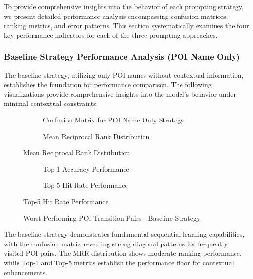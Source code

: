 \documentclass[12pt,a4paper]{article}
\begin{document}
To provide comprehensive insights into the behavior of each prompting strategy, we present detailed performance analysis encompassing confusion matrices, ranking metrics, and error patterns. This section systematically examines the four key performance indicators for each of the three prompting approaches.

\subsubsection{Baseline Strategy Performance Analysis (POI Name Only)}

The baseline strategy, utilizing only POI names without contextual information, establishes the foundation for performance comparison. The following visualizations provide comprehensive insights into the model's behavior under minimal contextual constraints.

\begin{figure}[h]
\centering
\begin{subfigure}{0.48\textwidth}
\centering
\caption{Confusion Matrix for POI Name Only Strategy}
\label{fig:baseline_confusion}
\end{subfigure}
\hfill
\begin{subfigure}{0.48\textwidth}
\centering
\caption{Mean Reciprocal Rank Distribution}
\label{fig:baseline_mrr}
\end{subfigure}
\end{figure}

\begin{figure}[h]
\centering
\begin{subfigure}{0.48\textwidth}
\centering
\caption{Top-1 Accuracy Performance}
\label{fig:baseline_top1}
\end{subfigure}
\hfill
\begin{subfigure}{0.48\textwidth}
\centering
\caption{Top-5 Hit Rate Performance}
\label{fig:baseline_top5}
\end{subfigure}
\end{figure}

\begin{figure}[h]
\centering
\caption{Worst Performing POI Transition Pairs - Baseline Strategy}
\label{fig:baseline_worst_pairs}
\end{figure}

The baseline strategy demonstrates fundamental sequential learning capabilities, with the confusion matrix revealing strong diagonal patterns for frequently visited POI pairs. The MRR distribution shows moderate ranking performance, while Top-1 and Top-5 metrics establish the performance floor for contextual enhancements.
\end{document}
